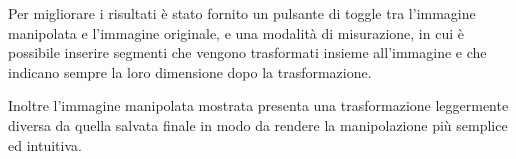 Per migliorare i risultati è stato fornito un pulsante di toggle tra l'immagine manipolata e l'immagine originale, e una modalità di misurazione, in cui è possibile inserire segmenti che vengono trasformati insieme all'immagine e che indicano sempre la loro dimensione dopo la trasformazione.

Inoltre l'immagine manipolata mostrata presenta una trasformazione leggermente diversa da quella salvata finale in modo da rendere la manipolazione più semplice ed intuitiva.
